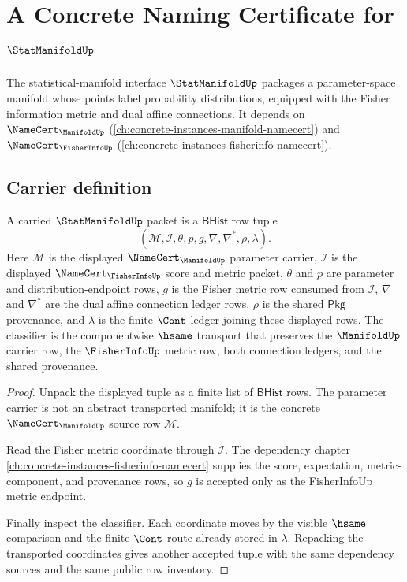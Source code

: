 \chapter{A Concrete Naming Certificate for $\StatManifoldUp$}
\label{ch:concrete-instances-statmanifold-namecert}

The statistical-manifold interface $\StatManifoldUp$ packages a parameter-space manifold whose points label probability distributions, equipped with the Fisher information metric and dual affine connections. It depends on $\NameCert_{\ManifoldUp}$ (\autoref{ch:concrete-instances-manifold-namecert}) and $\NameCert_{\FisherInfoUp}$ (\autoref{ch:concrete-instances-fisherinfo-namecert}).

\section{Carrier definition}
\label{sec:statmanifold-carrier}

\begin{theorem}
\label{thm:statmanifold-carrier-classifier-obligation}
A carried $\StatManifoldUp$ packet is a $\mathsf{BHist}$ row tuple
$$
(\mathcal{M},\mathcal{I},\theta,p,g,\nabla,\nabla^\ast,\rho,\lambda).
$$
Here $\mathcal{M}$ is the displayed $\NameCert_{\ManifoldUp}$ parameter
carrier, $\mathcal{I}$ is the displayed $\NameCert_{\FisherInfoUp}$ score and
metric packet, $\theta$ and $p$ are parameter and distribution-endpoint rows,
$g$ is the Fisher metric row consumed from $\mathcal{I}$, $\nabla$ and
$\nabla^\ast$ are the dual affine connection ledger rows, $\rho$ is the shared
$\mathsf{Pkg}$ provenance, and $\lambda$ is the finite $\Cont$ ledger joining
these displayed rows. The classifier is the componentwise $\hsame$ transport
that preserves the $\ManifoldUp$ carrier row, the $\FisherInfoUp$ metric row,
both connection ledgers, and the shared provenance.
\end{theorem}
\begin{proof}
Unpack the displayed tuple as a finite list of $\mathsf{BHist}$ rows. The
parameter carrier is not an abstract transported manifold; it is the concrete
$\NameCert_{\ManifoldUp}$ source row $\mathcal{M}$.

Read the Fisher metric coordinate through $\mathcal{I}$. The dependency
chapter \autoref{ch:concrete-instances-fisherinfo-namecert} supplies the
score, expectation, metric-component, and provenance rows, so $g$ is accepted
only as the FisherInfoUp metric endpoint.

Finally inspect the classifier. Each coordinate moves by the visible
$\hsame$ comparison and the finite $\Cont$ route already stored in
$\lambda$. Repacking the transported coordinates gives another accepted tuple
with the same dependency sources and the same public row inventory.
\end{proof}


